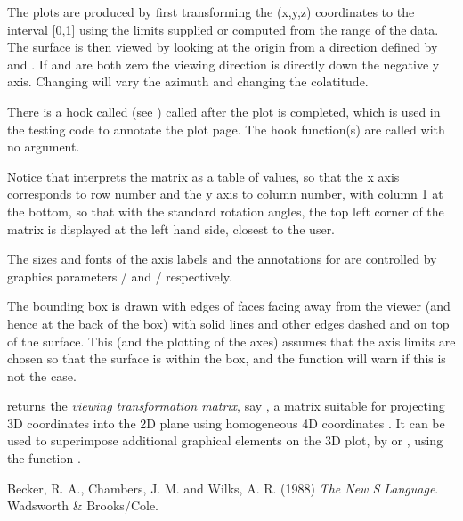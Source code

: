 \begin{Details}\relax
The plots are produced by first transforming the (x,y,z)
coordinates to the interval [0,1] using the limits supplied or
computed from the range of the data.  The surface is then viewed
by looking at the origin from a direction defined by 
and .  If  and  are both zero
the viewing direction is directly down the negative y axis.
Changing  will vary the azimuth and changing 
the colatitude.

There is a hook called  (see )
called after the plot is completed, which is used in the
testing code to annotate the plot page.  The hook function(s) are
called with no argument.

Notice that  interprets the  matrix as a table of
 values, so that the x axis corresponds to row
number and the y axis to column number, with column 1 at the bottom,
so that with the standard rotation angles, the top left corner of the
matrix is displayed at the left hand side, closest to the user.

The sizes and fonts of the axis labels and the annotations for
 are controlled by graphics parameters
/ and
/ respectively.

The bounding box is drawn with edges of faces facing away from the
viewer (and hence at the back of the box) with solid lines and other
edges dashed and on top of the surface.  This (and the plotting of the
axes) assumes that the axis limits are chosen so that the surface
is within the box, and the function will warn if this is not the case.
\end{Details}
%
\begin{Value}
 returns the \emph{viewing transformation matrix}, say
, a  matrix suitable for projecting 3D
coordinates  into the 2D plane using homogeneous 4D
coordinates .  It can be used to superimpose
additional graphical elements on the 3D plot, by
 or , using the
function . 
\end{Value}
%
\begin{References}\relax
Becker, R. A., Chambers, J. M. and Wilks, A. R. (1988)
\emph{The New S Language}.
Wadsworth \& Brooks/Cole.
\end{References}
